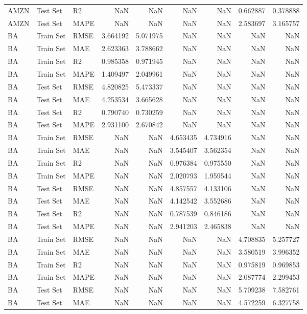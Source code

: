 \begin{tabular}{lllrrrrrr}
AMZN & Test Set & R2 & NaN & NaN & NaN & NaN & 0.662887 & 0.378888 \\
AMZN & Test Set & MAPE & NaN & NaN & NaN & NaN & 2.583697 & 3.165757 \\
BA & Train Set & RMSE & 3.664192 & 5.071975 & NaN & NaN & NaN & NaN \\
BA & Train Set & MAE & 2.623363 & 3.788662 & NaN & NaN & NaN & NaN \\
BA & Train Set & R2 & 0.985358 & 0.971945 & NaN & NaN & NaN & NaN \\
BA & Train Set & MAPE & 1.409497 & 2.049961 & NaN & NaN & NaN & NaN \\
BA & Test Set & RMSE & 4.820825 & 5.473337 & NaN & NaN & NaN & NaN \\
BA & Test Set & MAE & 4.253534 & 3.665628 & NaN & NaN & NaN & NaN \\
BA & Test Set & R2 & 0.790740 & 0.730259 & NaN & NaN & NaN & NaN \\
BA & Test Set & MAPE & 2.931100 & 2.670842 & NaN & NaN & NaN & NaN \\
BA & Train Set & RMSE & NaN & NaN & 4.653435 & 4.734916 & NaN & NaN \\
BA & Train Set & MAE & NaN & NaN & 3.545407 & 3.562354 & NaN & NaN \\
BA & Train Set & R2 & NaN & NaN & 0.976384 & 0.975550 & NaN & NaN \\
BA & Train Set & MAPE & NaN & NaN & 2.020793 & 1.959544 & NaN & NaN \\
BA & Test Set & RMSE & NaN & NaN & 4.857557 & 4.133106 & NaN & NaN \\
BA & Test Set & MAE & NaN & NaN & 4.142542 & 3.552686 & NaN & NaN \\
BA & Test Set & R2 & NaN & NaN & 0.787539 & 0.846186 & NaN & NaN \\
BA & Test Set & MAPE & NaN & NaN & 2.941203 & 2.465838 & NaN & NaN \\
BA & Train Set & RMSE & NaN & NaN & NaN & NaN & 4.708835 & 5.257727 \\
BA & Train Set & MAE & NaN & NaN & NaN & NaN & 3.580519 & 3.996352 \\
BA & Train Set & R2 & NaN & NaN & NaN & NaN & 0.975819 & 0.969853 \\
BA & Train Set & MAPE & NaN & NaN & NaN & NaN & 2.087774 & 2.299453 \\
BA & Test Set & RMSE & NaN & NaN & NaN & NaN & 5.709238 & 7.582761 \\
BA & Test Set & MAE & NaN & NaN & NaN & NaN & 4.572259 & 6.327758 \\

\end{tabular}
